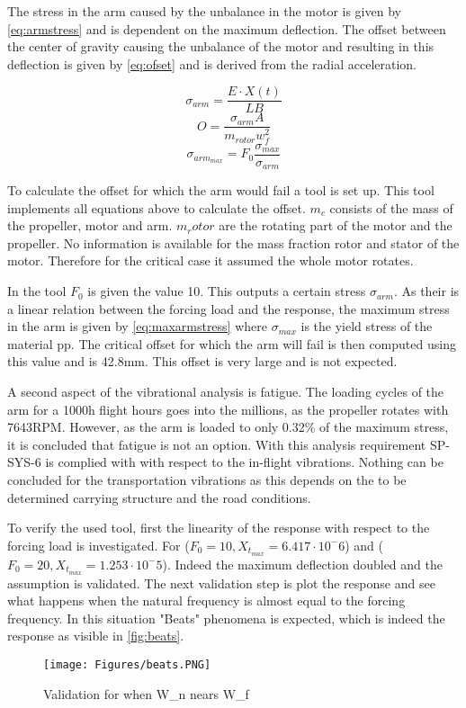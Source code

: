 The stress in the arm caused by the unbalance in the motor is given by \autoref{eq:armstress} and is dependent on the maximum deflection. The offset between the center of gravity causing the unbalance of the motor and resulting in this deflection is given by \autoref{eq:ofset} and is derived from the radial acceleration.
\begin{multicols}{3}\setlength{\columnseprule}{0pt}
\begin{equation} \label{eq:armstress}
    \sigma_{arm} = \frac{E\cdot  X(t)}{LB}
\end{equation}
\break
\begin{equation} \label{eq:ofset}
    O =  \frac{\sigma_{arm} A}{m_{rotor} w_f^2}
\end{equation}
\break
\begin{equation}\label{eq:maxarmstress}
    \sigma_{arm}_{max} = F_0 \frac{\sigma_{max}}{\sigma_{arm}}
\end{equation}
\end{multicols}
To calculate the offset for which the arm would fail a tool is set up. This tool implements all equations above to calculate the offset. $m_c$ consists of the mass of the propeller, motor and arm. $m_rotor$ are the rotating part of the motor and the propeller. No information is available for the mass fraction rotor and stator of the motor. Therefore for the critical case it assumed the whole motor rotates.

In the tool $F_0$ is given the value 10. This outputs a certain stress $\sigma_{arm}$. As their is a linear relation between the forcing load and the response, the maximum stress in the arm is given by \autoref{eq:maxarmstress} where $\sigma_{max}$ is the yield stress of the material pp. The critical offset for which the arm will fail is then computed using this value and is 42.8mm. This offset is very large and is not expected. 

A second aspect of the vibrational analysis is fatigue. The loading cycles of the arm for a 1000h flight hours goes into the millions, as the propeller rotates with 7643RPM. However, as the arm is loaded to only 0.32\% of the maximum stress, it is concluded that fatigue is not an option. With this analysis requirement SP-SYS-6 is complied with with respect to the in-flight vibrations. Nothing can be concluded for the transportation vibrations as this depends on the to be determined carrying structure and the road conditions.

To verify the used tool, first the linearity of the response with respect to the forcing load is investigated. For ($F_0 = 10, X_t_{max} = 6.417\cdot 10^-6$) and ($F_0 = 20, X_t_{max} = 1.253\cdot 10^-5$). Indeed the maximum deflection doubled and the assumption is validated. The next validation step is plot the response and see what happens when the natural frequency is almost equal to the forcing frequency. In this situation "Beats" phenomena is expected, which is indeed the response as visible in \autoref{fig:beats}.
\begin{figure}[H]
    \centering
    \texttt{[image: Figures/beats.PNG]}
    \caption{Validation for when W_n nears W_f}
    \label{fig:beats}
\end{figure}


